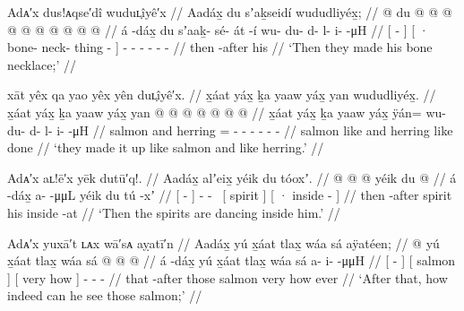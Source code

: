 \ex\label{ex:100-186-bone-necklace}%
%
\begingl
	\glpreamble	Adᴀ′x dus!ᴀqse′dî wuduʟ̣îyê′x //
	\glpreamble	Aadáx̱ du sʼaḵseidí wududliyéx̱; //
	\gla	{}  @ {} {} 
		{} du  @ {} @ {} @ {} {} 
		 @ {} @ {} @ {} @ {} @ {} @ {} @ {} //
	\glb	{} á -dáx̱ {}
		{} du sʼaaḵ- sé- át -í {}
		wu- du- d- l- i-  -μH //
	\glc	{}[  - {}]
		{}[ · bone- neck- thing - {}]
		- - - - -  - //
	\gld	{} then -after {} 
		{} his  {} {} {} {} 
		 {} {} {} {} {} {} {} //
	\glft	‘Then they made his bone necklace;’
		//
\endgl
\xe

\ex\label{ex:100-187-bone-necklace}%
%
\begingl
	\glpreamble	xāt yêx qa yao yêx yên duʟ̣îyê′x. //
	\glpreamble	x̱áat yáx̱ ḵa yaaw yáx̱ yan wududliyéx̱. //
	\gla	{} x̱áat yáx̱ {} 
		ḵa
		{} yaaw yáx̱ {} 
		yan @  @ {} @ {} @ {} @ {} @ {} @ {} //
	\glb	{} x̱áat yáx̱ {}
		ḵa
		{} yaaw yáx̱ {}
		ÿán= wu- du- d- l- i-  -μH //
	\glc	{} salmon  {} 
		and
		{} herring  {}
		= - - - - -  - //
	\gld	{} salmon like {}
		and
		{} herring like {}
		done  {} {} {} {} {} {} //
	\glft	‘they made it up like salmon and like herring.’
		//
\endgl
\xe

\ex\label{ex:100-188-spirits-dancing}%
%
\begingl
	\glpreamble	Adᴀ′x aʟ!ē′x yēk dutū′q!. //
	\glpreamble	Aadáx̱ alʼeix̱ yéik du tóoxʼ. //
	\gla	{}  @ {} {} 
		 @ {} @ {}
		{} yéik {} 
		{} du  @ {} {} //
	\glb	{} á -dáx̱ {}
		a-  -μμL
		{} yéik {} 
		{} du tú -xʼ {} //
	\glc	{}[  - {}]
		-  -~
		{}[ spirit {}]
		{}[ · inside - {}] //
	\gld	{} then -after {} 
		 {} {}
		{} spirit {}
		{} his inside -at {} //
	\glft	‘Then the spirits are dancing inside him.’
		//
\endgl
\xe

\ex\label{ex:100-189-can-see-salmon}%
%
\begingl
	\glpreamble	Adᴀ′x yuxā′t ʟᴀx wā′sᴀ aỵatī′n //
	\glpreamble	Aadáx̱ yú x̱áat tlax̱ wáa sá aÿatéen; //
	\gla	{}  @ {} {}
		{} yú x̱áat {}
		{} tlax̱ wáa sá {}
		 @ {} @ {} @ {} //
	\glb	{} á -dáx̱ {}
		{} yú x̱áat {}
		{} tlax̱ wáa sá {}
		a- i-  -μμH //
	\glc	{}[  - {}]
		{}[  salmon {}]
		{}[ very how  {}]
		- -  - //
	\gld	{} that -after {}
		{} those salmon {}
		{} very how ever {}
		 {} {} {} //
	\glft	‘After that, how indeed can he see those salmon;’
		//
\endgl
\xe

